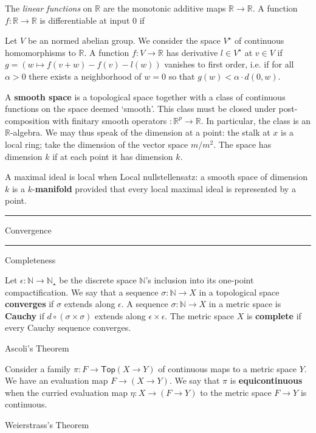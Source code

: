 \documentclass[12pt]{article}
\newcommand{\NN}{\mathbb{N}}
\newcommand{\RR}{\mathbb{R}}
\newcommand{\Top}{\mathsf{Top}}
\newcommand{\moosection}[1]{
  \begin{center}\parbox{\textwidth}{\begin{center}
    \hrule\vspace{0.25cm}
    \Large\sc#1\vspace{0.25cm}
    \hrule
  \end{center}}\end{center}
}
\newcommand{\mooparagraph}[1]{
  \begin{center}\parbox{8cm}{\begin{center}
    \large\sc#1\vspace{-0.25cm}
  \end{center}}\end{center}
}
\begin{document}
      The \emph{linear functions} on $\RR$ are the monotonic additive maps
      $\RR\to\RR$.
      A function $f:\RR\to\RR$ is differentiable at input $0$ if  

      Let $V$ be an normed abelian group.  We consider the space $V^\star$
      of continuous homomorphisms to $\RR$.
      A function $f:V\to \RR$ has derivative $l\in V^\star$ at $v\in V$ if 
      $g=(w \mapsto f(v+w)-f(v) - l(w))$ vanishes to first order, i.e. if
      for all $\alpha>0$ there exists a neighborhood of $w=0$ so that
      $g(w) < \alpha\cdot d(0,w)$.

      
      A \textbf{smooth space} is a topological space together with a class of
      continuous functions on the space deemed `smooth'.  This class must be
      closed under post-composition with finitary smooth operators $:\RR^p\to
      \RR$.  In particular, the class is an $\RR$-algebra.  We may thus speak
      of the dimension at a point: the stalk at $x$ is a local ring; take
      the dimension of the vector space $m/m^2$.  The space has dimension $k$ 
      if at each point it has dimension $k$.

      A maximal ideal is local when    
      Local nullstellensatz: a smooth space of dimension $k$ is a $k$-\textbf{manifold}
      provided that every local maximal ideal is represented by a point.

  \moosection{Convergence}
    \mooparagraph{Completeness}
      Let $\epsilon:\NN\to \NN_\star$ be the discrete space $\NN$'s inclusion
      into its one-point compactification.
      We say that a sequence $\sigma:\NN\to X$ in a topological space
      \textbf{converges} if $\sigma$ extends along $\epsilon$.
      A sequence $\sigma:\NN\to X$ in a metric space
      is \textbf{Cauchy} if $d \circ (\sigma \times \sigma)$
      extends along $\epsilon\times \epsilon$.
      The metric space $X$ is \textbf{complete} if every Cauchy sequence
      converges.
      
    \mooparagraph{Ascoli's Theorem}
      Consider a family $\pi:F\to \Top(X\to Y)$ of continuous maps to a metric space $Y$.
      We have an evaluation map $F\to (X\to Y)$.
      We say that $\pi$ is \textbf{equicontinuous} when
      the curried evaluation map $\eta:X\to (F\to Y)$ to the metric space
      $F\to Y$ is continuous.

    \mooparagraph{Weierstrass's Theorem}
    \mooparagraph{}
  
\end{document}
